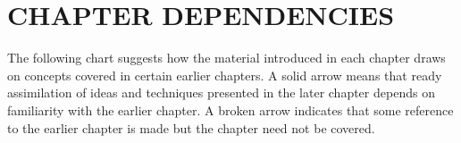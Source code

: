 \section*{CHAPTER DEPENDENCIES}

The following chart suggests how the 
material introduced in each chapter draws on concepts covered in certain
 earlier chapters. A solid arrow means that ready assimilation of ideas 
and techniques presented in the later chapter depends on familiarity 
with the earlier chapter. A broken arrow indicates that some reference 
to the earlier chapter is made but the chapter need not be covered.

\begin{figure}[H]
\centering

\end{figure}





